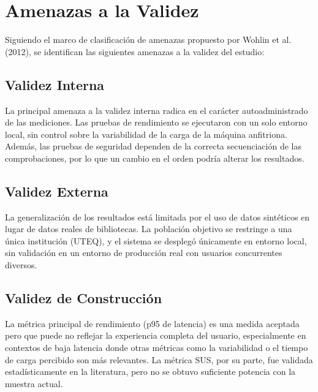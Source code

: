 \documentclass[
11pt,
a4paper,
]{report}
\begin{document}
	\hypertarget{amenazas-a-la-validez}{%
		\section{Amenazas a la Validez}\label{amenazas-a-la-validez}}
	
	Siguiendo el marco de clasificación de amenazas propuesto por Wohlin et al. (2012), se identifican las siguientes amenazas a la validez del estudio:
	
	\hypertarget{validez-interna}{%
		\subsection{Validez Interna}\label{validez-interna}}
	
	La principal amenaza a la validez interna radica en el carácter autoadministrado de las mediciones. Las pruebas de rendimiento se ejecutaron con un solo entorno local, sin control sobre la variabilidad de la carga de la máquina anfitriona. Además, las pruebas de seguridad dependen de la correcta secuenciación de las comprobaciones, por lo que un cambio en el orden podría alterar los resultados.
	
	\hypertarget{validez-externa}{%
		\subsection{Validez Externa}\label{validez-externa}}
	
	La generalización de los resultados está limitada por el uso de datos sintéticos en lugar de datos reales de bibliotecas. La población objetivo se restringe a una única institución (UTEQ), y el sistema se desplegó únicamente en entorno local, sin validación en un entorno de producción real con usuarios concurrentes diversos.
	
	\hypertarget{validez-de-construccion}{%
		\subsection{Validez de Construcción}\label{validez-de-construccion}}
	
	La métrica principal de rendimiento (p95 de latencia) es una medida aceptada pero que puede no reflejar la experiencia completa del usuario, especialmente en contextos de baja latencia donde otras métricas como la variabilidad o el tiempo de carga percibido son más relevantes. La métrica SUS, por su parte, fue validada estadísticamente en la literatura, pero no se obtuvo suficiente potencia con la muestra actual.
	
\end{document}
